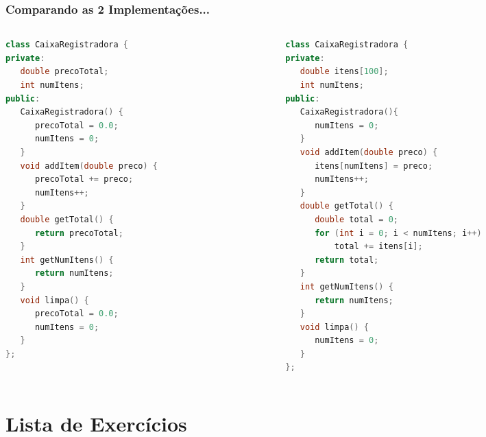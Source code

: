 \documentclass[aspectratio=169]{beamer}
\begin{document}
\begin{frame}[fragile]\frametitle{Comparando as 2 Implementações...}
\begin{columns}
\begin{column}{0.5\linewidth}
\begin{lstlisting}[language=C++,basicstyle=\ttfamily\tiny]
class CaixaRegistradora {
private:
   double precoTotal;
   int numItens;
public:
   CaixaRegistradora() {
      precoTotal = 0.0;
      numItens = 0;
   }
   void addItem(double preco) {
      precoTotal += preco;
      numItens++;
   }
   double getTotal() {
      return precoTotal;
   }
   int getNumItens() {
      return numItens;
   }
   void limpa() {
      precoTotal = 0.0;
      numItens = 0;
   }
};
\end{lstlisting}
\end{column}
\begin{column}{0.5\linewidth}
\begin{lstlisting}[language=C++,basicstyle=\ttfamily\tiny]
class CaixaRegistradora {
private:
   double itens[100];
   int numItens;
public:
   CaixaRegistradora(){
      numItens = 0;
   }
   void addItem(double preco) {
      itens[numItens] = preco;
      numItens++;
   }
   double getTotal() {
      double total = 0;
      for (int i = 0; i < numItens; i++)
          total += itens[i];
      return total;
   }
   int getNumItens() {
      return numItens;
   }
   void limpa() {
      numItens = 0;
   }
};
\end{lstlisting}
\end{column}
\end{columns}
\end{frame}

\section{Lista de Exercícios}
\end{document}
